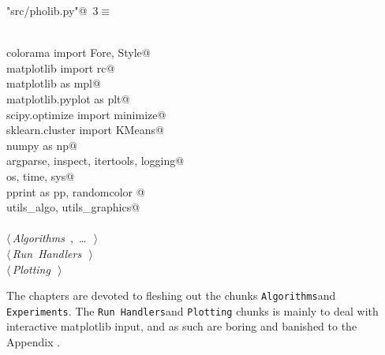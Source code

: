 \documentclass[10pt, english, oneside]{report}
\begin{document}
\begin{flushleft} \small\label{scrap1}\raggedright\small
{} \verb@"src/pholib.py"@\nobreak\ {\footnotesize {3}}$\equiv$
\vspace{-1ex}
\begin{list}{}{} \item
\mbox{}\verb@@\\
\mbox{}\verb@from colorama import Fore, Style@\\
\mbox{}\verb@from matplotlib import rc@\\
\mbox{}\verb@import matplotlib as mpl@\\
\mbox{}\verb@import matplotlib.pyplot as plt@\\
\mbox{}\verb@from scipy.optimize import minimize@\\
\mbox{}\verb@from sklearn.cluster import KMeans@\\
\mbox{}\verb@import numpy as np@\\
\mbox{}\verb@import argparse, inspect, itertools, logging@\\
\mbox{}\verb@import os, time, sys@\\
\mbox{}\verb@import pprint as pp, randomcolor @\\
\mbox{}\verb@import utils_algo, utils_graphics@\\
\mbox{}\verb@@\\
\mbox{}\verb@@\hbox{$\langle\,${\itshape Algorithms}\nobreak\ {\footnotesize {}, \ldots\ }$\,\rangle$}\verb@@\\
\mbox{}\verb@@\hbox{$\langle\,${\itshape Run Handlers}\nobreak\ {\footnotesize {}}$\,\rangle$}\verb@@\\
\mbox{}\verb@@\hbox{$\langle\,${\itshape Plotting}\nobreak\ {\footnotesize {}}$\,\rangle$}\verb@@\\
\mbox{}\verb@@{\NWsep}
\end{list}
\vspace{-1.5ex}
\footnotesize
\begin{list}{}{\setlength{\itemsep}{-\parsep}\setlength{\itemindent}{-\leftmargin}}

\item{}
\end{list}
\vspace{4ex}
\end{flushleft}

The chapters are devoted to fleshing out the chunks \textlangle \verb|Algorithms|\textrangle and 
\textlangle\verb|Experiments|\textrangle.  The \newline \textlangle \verb|Run Handlers|\textrangle and 
\textlangle \verb|Plotting|\textrangle \; chunks is mainly to deal with interactive matplotlib input, 
and as such are boring and banished to the Appendix \Winkey . 
\end{document}
